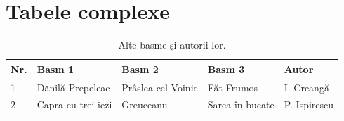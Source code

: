 \documentclass[12pt, a4paper, oneside, romanian, draft]{teza-upb}
\begin{document}
\section{Tabele complexe}
\begin{table}[ht]
  \centering
  \small
  \begin{tabularx}{\textwidth}{l|X|X|X|l}
    \toprule
    \textbf{Nr.} & \textbf{Basm 1}    & \textbf{Basm 2}    & \textbf{Basm 3} & \textbf{Autor} \\
    \midrule
    1            & Dănilă Prepeleac   & Prâslea cel Voinic & Făt-Frumos      & I. Creangă     \\
    2            & Capra cu trei iezi & Greuceanu          & Sarea în bucate & P. Ispirescu   \\
    \bottomrule
  \end{tabularx}
  \caption{Alte basme și autorii lor.}
  \label{tab:basme}
\end{table}
\end{document}

